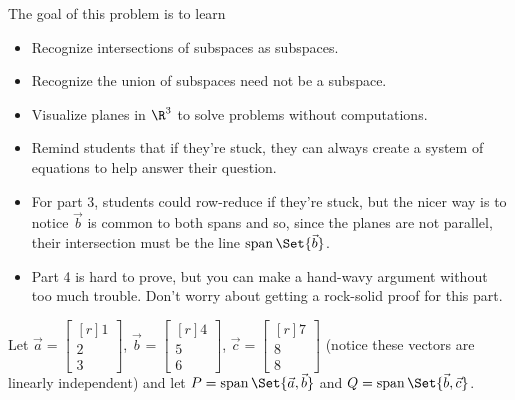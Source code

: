 \documentclass{problemset}
\DeclareMathOperator{\Span}{span}
\newcommand{\mat}[1]{\begin{bmatrix*}[r]#1\end{bmatrix*}}
\begin{document}
	\question
	\begin{annotation}
		\begin{goals}

			The goal of this problem is to learn
			\begin{itemize}
				\item Recognize intersections of subspaces as subspaces.
				\item Recognize the union of subspaces need not be a subspace.
				\item Visualize planes in $\R^3$ to solve problems without computations.
			\end{itemize}
		\end{goals}

		\begin{notes}
			\begin{itemize}
				\item Remind students that if they're stuck, they can always create a system
					of equations to help answer their question.
				\item For part 3, students could row-reduce if they're stuck, but the nicer
					way is to notice $\vec b$ is common to both spans and so, since the
					planes are not parallel, their intersection must be the line $\Span\Set{\vec b}$.
				\item Part 4 is hard to prove, but you can make a hand-wavy argument without
					too much trouble. Don't worry about getting a rock-solid proof for this part.
			\end{itemize}
		\end{notes}
	\end{annotation}
	Let $\vec a=\mat{1\\2\\3}$, $\vec b=\mat{4\\5\\6}$, $\vec c=\mat{7\\8\\8}$ (notice these vectors
	are linearly independent) and
	let $P=\Span\Set{\vec a,\vec b}$ and $Q=\Span\Set{\vec b,\vec c}$.
\end{document}
